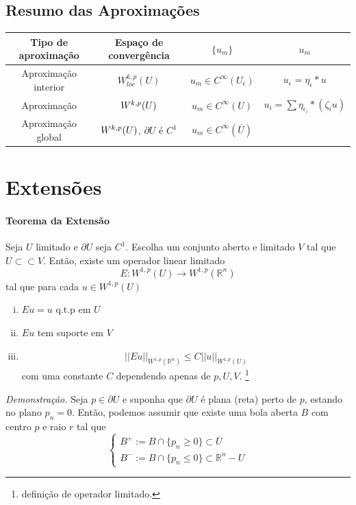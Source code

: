 \documentclass[11pt]{article}
\newcommand{\Rn}{{\mathbb{R}^n}}
\newcommand{\e}{\epsilon}
\newcommand{\pu}{\partial U}
\begin{document}
\subsection*{Resumo das Aproximações}

\begin{tabular}{cccc}
	\hline
	Tipo de aproximação & Espaço de convergência & \( \{u_m\} \)  & \( u_m \) \\
	\hline
	Aproximação interior	& \( W^{k,p}_{loc}(U) \) 	& \( u_m \in C^\infty(U_\e) \) & \( u_\e = \eta_\e * u \)\\
	
	Aproximação    			& \( W^{k,p}(U) \) 		& \( u_m \in C^\infty(U)  \) & \( u_i = \sum \eta_{\e_i} * (\zeta_i u) \) \\
	
	Aproximação global	 	& \( W^{k,p}(U)\), $ \pu $ é $ C^1 $		& \( u_m \in C^\infty(\overline{U}) \) &  \\
	\hline
\end{tabular}





\section{Extensões}

\paragraph{Teorema da Extensão} Seja \( U \) limitado e \( \pu \) seja \( C^1 \).  Escolha um conjunto aberto e limitado \( V \) tal que \( U \subset\subset V \). Então, existe um operador linear limitado \[ E:W^{1,p}(U) \rightarrow W^{1,p}(\Rn) \] tal que para cada \( u \in W^{1,p}(U) \) \begin{enumerate}[(i)]
	\item \( Eu=u \) q.t.p em \( U \)
	\item \( Eu \) tem suporte em \( V \)
	\item \[ ||Eu||_{W^{1,p}(\Rn)} \leq C ||u||_{W^{1,p}(U)} \] com uma constante \( C \) dependendo apenas de \( p, U, V \). \footnote{definição de operador limitado.}
\end{enumerate}

\textit{Demonstração.} Seja \( p \in \pu \) e suponha que \( \pu \) é plana (reta) perto de \( p \), estando no plano \( p_n=0 \). Então, podemos assumir que existe uma bola aberta \( B \) com centro \( p \) e raio \( r \) tal que \[ \begin{cases}
	B^+ := B \cap \{ p_n \geq 0 \}  \subset \overline{U}\\
	B^- := B \cap \{ p_n \leq 0 \} \subset \Rn - U 
\end{cases} \]
\end{document}
